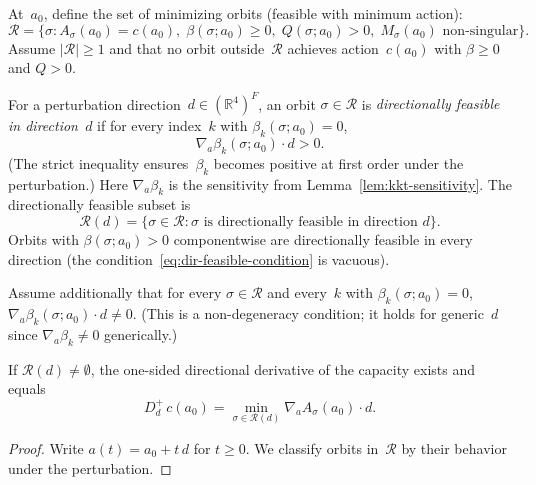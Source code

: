 \begin{unverified}
\begin{theorem}%
\label{thm:subdiff-with-appearance}
At~$a_0$, define the set of minimizing orbits
(feasible with minimum action):
\begin{equation}\label{eq:minimizer-set}
  \mathcal{R} = \bigl\{\sigma :
    A_\sigma(a_0) = c(a_0),\;
    \beta(\sigma; a_0) \geq 0,\;
    Q(\sigma; a_0) > 0,\;
    M_\sigma(a_0) \text{ non-singular}
  \bigr\}.
\end{equation}
Assume $|\mathcal{R}| \geq 1$ and that no orbit
outside~$\mathcal{R}$ achieves action~$c(a_0)$
with $\beta \geq 0$ and $Q > 0$.

For a perturbation direction~$d \in (\mathbb{R}^4)^F$,
an orbit $\sigma \in \mathcal{R}$ is
\emph{directionally feasible in direction~$d$} if for every
index~$k$ with $\beta_k(\sigma; a_0) = 0$,
\begin{equation}\label{eq:dir-feasible-condition}
  \nabla_a \beta_k(\sigma; a_0) \cdot d > 0.
\end{equation}
(The strict inequality ensures~$\beta_k$
becomes positive at first order under the perturbation.)
Here $\nabla_a \beta_k$ is the sensitivity from
Lemma~\ref{lem:kkt-sensitivity}.
The directionally feasible subset is
\begin{equation}\label{eq:dir-feasible-set}
  \mathcal{R}(d) = \bigl\{\sigma \in \mathcal{R} :
    \sigma \text{ is directionally feasible in direction } d
  \bigr\}.
\end{equation}
Orbits with $\beta(\sigma; a_0) > 0$ componentwise are
directionally feasible in every direction
(the condition~\eqref{eq:dir-feasible-condition} is vacuous).

Assume additionally that for every $\sigma \in \mathcal{R}$
and every~$k$ with $\beta_k(\sigma; a_0) = 0$,
$\nabla_a \beta_k(\sigma; a_0) \cdot d \neq 0$.
(This is a non-degeneracy condition; it holds for
generic~$d$ since $\nabla_a \beta_k \neq 0$ generically.)

If $\mathcal{R}(d) \neq \emptyset$, the one-sided directional
derivative of the capacity exists and equals
\begin{equation}\label{eq:subdiff-appearance}
  D_d^+\, c(a_0) = \min_{\sigma \in \mathcal{R}(d)}
    \nabla_a A_\sigma(a_0) \cdot d.
\end{equation}
\end{theorem}

\begin{proof}
Write $a(t) = a_0 + t\,d$ for $t \geq 0$.
We classify orbits in~$\mathcal{R}$ by their behavior
under the perturbation.


\end{proof}
\end{unverified}
